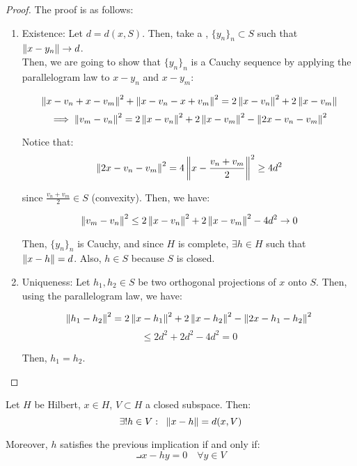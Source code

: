 \begin{proof}
    The proof is as follows:
    \begin{enumerate}[label=\arabic*)]
        \item Existence: Let $d = d(x, S)$. Then, take a ,
        $\{y_n\}_n \subset S$ such that $\left\|x - y_n\right\| \to d$.\\

        Then, we are going to show that $\{y_n\}_n$ is a Cauchy sequence by applying
        the parallelogram law to $x - y_n$ and $x - y_m$:

        $$\left\|x - v_n + x - v_m\right\|^2 + \left\|x - v_n - x + v_m\right\|^2 = 2 \left\|x - v_n\right\|^2 + 2 \left\|x - v_m\right\|$$
        $$\implies \left\|v_m - v_n\right\|^2 = 2 \left\|x - v_n\right\|^2 + 2 \left\|x - v_m\right\|^2 - \left\|2x - v_n - v_m\right\|^2$$

        Notice that:
        $$\left\|2x - v_n - v_m\right\|^2 = 4 \left\|x - \frac{v_n + v_m}{2}\right\|^2 \geq 4d^2$$

        since $\frac{v_n + v_m}{2} \in S$ (convexity). Then, we have:

        $$\left\|v_m - v_n\right\|^2 \leq 2 \left\|x - v_n\right\|^2 + 2 \left\|x - v_m\right\|^2 - 4d^2 \to 0$$

        Then, $\{y_n\}_n$ is Cauchy, and since $H$ is complete, $\exists h \in H$ such that
        $\left\|x - h\right\| = d$. Also, $h \in S$ because $S$ is closed.

        \item Uniqueness: Let $h_1, h_2 \in S$ be two orthogonal projections of $x$ onto $S$.
        Then, using the parallelogram law, we have:

        $$\left\|h_1 - h_2\right\|^2 = 2 \left\|x - h_1\right\|^2 + 2 \left\|x - h_2\right\|^2 - \left\|2x - h_1 - h_2\right\|^2$$
        $$\leq 2d^2 + 2d^2 - 4d^2 = 0$$

        Then, $h_1 = h_2$.

    \end{enumerate}
\end{proof}

\begin{ftheorem}
    Let $H$ be Hilbert, $x \in H$, $V \subset H$ a closed subspace. Then:
    $$\exists ! h \in V: \; \; \left\|x - h\right\| = d(x, V)$$

    Moreover, $h$ satisfies the previous implication if and only if:
    $$\intprod{x - h}{y} = 0 \quad \forall y \in V$$
    
\end{ftheorem}

